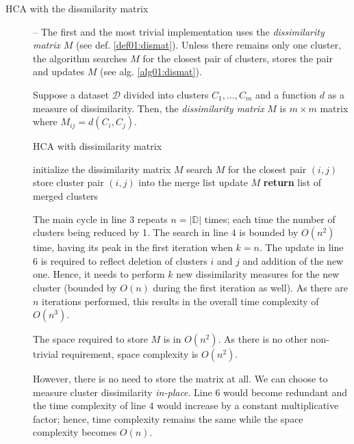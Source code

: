 \begin{description}
	\item[HCA with the dissmilarity matrix] -- The first and the most trivial implementation uses the \emph{dissimilarity matrix} $M$ (see def. \ref{def01:dismat}). Unless there remains only one cluster, the algorithm searches $M$ for the closest pair of clusters, stores the pair and updates $M$ (see alg. \ref{alg01:dismat}).
	
	\begin{defn}
		Suppose a dataset $\mathcal{D}$ divided into clusters $C_1,\dots,C_m$ and a function $d$ as a measure of dissimilarity. Then, the \emph{dissimilarity matrix} $M$ is $m\times m$ matrix where $M_{ij} = d(C_i,C_j)$.
		\label{def01:dismat}
	\end{defn}
	
	\begin{algorithm}
		\caption{HCA with dissimilarity matrix}
		\label{alg01:dismat}
		\begin{algorithmic}[1]
			\State initialize the dissimilarity matrix $M$
			\State search $M$ for the closest pair $(i,j)$ 
			\State store cluster pair $(i,j)$ into the merge list 
			\State update $M$ 
			\EndFor
			\State \textbf{return} list of merged clusters
			\EndProcedure
		\end{algorithmic}
	\end{algorithm}

	The main cycle in line $3$ repeats $n = |\mathbb{D}|$ times; each time the number of clusters being reduced by 1. The search in line $4$ is bounded by $O(n^2)$ time, having its peak in the first iteration when $k=n$. The update in line $6$ is required to reflect deletion of clusters $i$ and $j$ and addition of the new one. Hence, it needs to perform $k$ new dissimilarity measures for the new cluster (bounded by $O(n)$ during the first iteration as well). As there are $n$ iterations performed, this results in the overall time complexity of $O(n^3)$. 
	
	The space required to store $M$ is in $O(n^2)$. As there is no other non-trivial requirement, space complexity is $O(n^2)$. 
	\begin{rem}
		However, there is no need to store the matrix at all. We can choose to measure cluster dissimilarity \emph{in-place}. Line $6$ would become redundant and the time complexity of line $4$ would increase by a constant multiplicative factor; hence, time complexity remains the same while the space complexity becomes $O(n)$.
	\end{rem}
	


\end{description}
